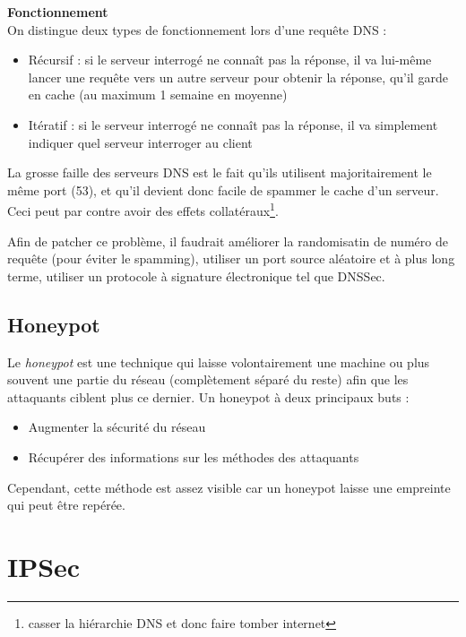 \documentclass[journal, a4paper]{IEEEtran}
\begin{document}
		\textbf{Fonctionnement}\\
		On distingue deux types de fonctionnement lors d'une requête DNS :
		\begin{itemize}
			\item Récursif : si le serveur interrogé ne connaît pas la réponse, il va lui-même lancer une requête vers un autre serveur pour obtenir la réponse, qu'il garde en cache (au maximum 1 semaine en moyenne)
			\item Itératif : si le serveur interrogé ne connaît pas la réponse, il va simplement indiquer quel serveur interroger au client
		\end{itemize}
		
		La grosse faille des serveurs DNS est le fait qu'ils utilisent majoritairement le même port (53), et qu'il devient donc facile de spammer le cache d'un serveur. Ceci peut par contre avoir des effets collatéraux\footnote{casser la hiérarchie DNS et donc faire tomber internet}.
		
		Afin de patcher ce problème, il faudrait améliorer la randomisatin de numéro de requête (pour éviter le spamming), utiliser un port source aléatoire et à plus long terme, utiliser un protocole à signature électronique tel que DNSSec.
		
	\subsection{Honeypot}
	
		Le \textit{honeypot} est une technique qui laisse volontairement une machine ou plus souvent une partie du réseau (complètement séparé du reste) afin que les attaquants ciblent plus ce dernier. Un honeypot à deux principaux buts :
		\begin{itemize}
			\item Augmenter la sécurité du réseau
			\item Récupérer des informations sur les méthodes des attaquants
		\end{itemize}
		
		Cependant, cette méthode est assez visible car un honeypot laisse une empreinte qui peut être repérée.
		
\section{IPSec}

	
		
		

	
\end{document}
